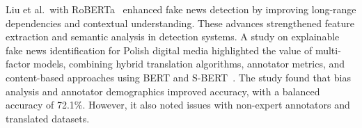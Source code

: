 \documentclass[runningheads]{llncs}
\begin{document}

Liu et al.~with RoBERTa~\cite{liu2019roberta} 
enhanced fake news detection by improving long-range dependencies and contextual understanding. These advances strengthened feature extraction and semantic analysis in detection systems. A study on explainable fake news identification for Polish digital media highlighted the value of multi-factor models, combining hybrid translation algorithms, annotator metrics, and content-based approaches using BERT and S-BERT~\cite{kozik2024explainable}. The study found that bias analysis and annotator demographics improved accuracy, with a balanced accuracy of 72.1\%. However, it also noted issues with non-expert annotators and translated datasets.

\end{document}
